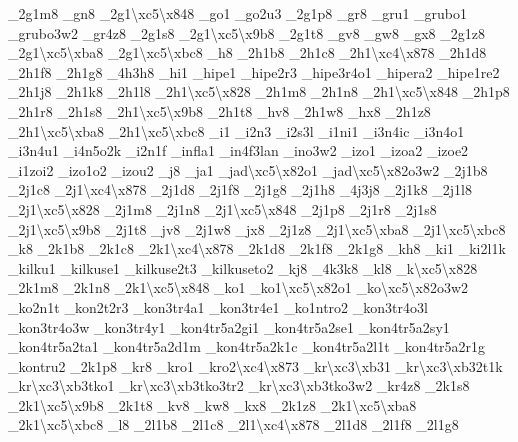 \begin{DoxyCompactItemize}
\-\_\-2g1m8 \-\_\-gn8 \-\_\-2g1\textbackslash{}xc5\textbackslash{}x848 \-\_\-go1 \-\_\-go2u3 \-\_\-2g1p8 \-\_\-gr8 \-\_\-gru1 \-\_\-grubo1 \-\_\-grubo3w2 \-\_\-gr4z8 \-\_\-2g1s8 \-\_\-2g1\textbackslash{}xc5\textbackslash{}x9b8 \-\_\-2g1t8 \-\_\-gv8 \-\_\-gw8 \-\_\-gx8 \-\_\-2g1z8 \-\_\-2g1\textbackslash{}xc5\textbackslash{}xba8 \-\_\-2g1\textbackslash{}xc5\textbackslash{}xbc8 \-\_\-h8 \-\_\-2h1b8 \-\_\-2h1c8 \-\_\-2h1\textbackslash{}xc4\textbackslash{}x878 \-\_\-2h1d8 \-\_\-2h1f8 \-\_\-2h1g8 \-\_\-4h3h8 \-\_\-hi1 \-\_\-hipe1 \-\_\-hipe2r3 \-\_\-hipe3r4o1 \-\_\-hipera2 \-\_\-hipe1re2 \-\_\-2h1j8 \-\_\-2h1k8 \-\_\-2h1l8 \-\_\-2h1\textbackslash{}xc5\textbackslash{}x828 \-\_\-2h1m8 \-\_\-2h1n8 \-\_\-2h1\textbackslash{}xc5\textbackslash{}x848 \-\_\-2h1p8 \-\_\-2h1r8 \-\_\-2h1s8 \-\_\-2h1\textbackslash{}xc5\textbackslash{}x9b8 \-\_\-2h1t8 \-\_\-hv8 \-\_\-2h1w8 \-\_\-hx8 \-\_\-2h1z8 \-\_\-2h1\textbackslash{}xc5\textbackslash{}xba8 \-\_\-2h1\textbackslash{}xc5\textbackslash{}xbc8 \-\_\-i1 \-\_\-i2n3 \-\_\-i2s3l \-\_\-i1ni1 \-\_\-i3n4ic \-\_\-i3n4o1 \-\_\-i3n4u1 \-\_\-i4n5o2k \-\_\-i2n1f \-\_\-infla1 \-\_\-in4f3lan \-\_\-ino3w2 \-\_\-izo1 \-\_\-izoa2 \-\_\-izoe2 \-\_\-i1zoi2 \-\_\-izo1o2 \-\_\-izou2 \-\_\-j8 \-\_\-ja1 \-\_\-jad\textbackslash{}xc5\textbackslash{}x82o1 \-\_\-jad\textbackslash{}xc5\textbackslash{}x82o3w2 \-\_\-2j1b8 \-\_\-2j1c8 \-\_\-2j1\textbackslash{}xc4\textbackslash{}x878 \-\_\-2j1d8 \-\_\-2j1f8 \-\_\-2j1g8 \-\_\-2j1h8 \-\_\-4j3j8 \-\_\-2j1k8 \-\_\-2j1l8 \-\_\-2j1\textbackslash{}xc5\textbackslash{}x828 \-\_\-2j1m8 \-\_\-2j1n8 \-\_\-2j1\textbackslash{}xc5\textbackslash{}x848 \-\_\-2j1p8 \-\_\-2j1r8 \-\_\-2j1s8 \-\_\-2j1\textbackslash{}xc5\textbackslash{}x9b8 \-\_\-2j1t8 \-\_\-jv8 \-\_\-2j1w8 \-\_\-jx8 \-\_\-2j1z8 \-\_\-2j1\textbackslash{}xc5\textbackslash{}xba8 \-\_\-2j1\textbackslash{}xc5\textbackslash{}xbc8 \-\_\-k8 \-\_\-2k1b8 \-\_\-2k1c8 \-\_\-2k1\textbackslash{}xc4\textbackslash{}x878 \-\_\-2k1d8 \-\_\-2k1f8 \-\_\-2k1g8 \-\_\-kh8 \-\_\-ki1 \-\_\-ki2l1k \-\_\-kilku1 \-\_\-kilkuse1 \-\_\-kilkuse2t3 \-\_\-kilkuseto2 \-\_\-kj8 \-\_\-4k3k8 \-\_\-kl8 \-\_\-k\textbackslash{}xc5\textbackslash{}x828 \-\_\-2k1m8 \-\_\-2k1n8 \-\_\-2k1\textbackslash{}xc5\textbackslash{}x848 \-\_\-ko1 \-\_\-ko1\textbackslash{}xc5\textbackslash{}x82o1 \-\_\-ko\textbackslash{}xc5\textbackslash{}x82o3w2 \-\_\-ko2n1t \-\_\-kon2t2r3 \-\_\-kon3tr4a1 \-\_\-kon3tr4e1 \-\_\-ko1ntro2 \-\_\-kon3tr4o3l \-\_\-kon3tr4o3w \-\_\-kon3tr4y1 \-\_\-kon4tr5a2gi1 \-\_\-kon4tr5a2se1 \-\_\-kon4tr5a2sy1 \-\_\-kon4tr5a2ta1 \-\_\-kon4tr5a2d1m \-\_\-kon4tr5a2k1c \-\_\-kon4tr5a2l1t \-\_\-kon4tr5a2r1g \-\_\-kontru2 \-\_\-2k1p8 \-\_\-kr8 \-\_\-kro1 \-\_\-kro2\textbackslash{}xc4\textbackslash{}x873 \-\_\-kr\textbackslash{}xc3\textbackslash{}xb31 \-\_\-kr\textbackslash{}xc3\textbackslash{}xb32t1k \-\_\-kr\textbackslash{}xc3\textbackslash{}xb3tko1 \-\_\-kr\textbackslash{}xc3\textbackslash{}xb3tko3tr2 \-\_\-kr\textbackslash{}xc3\textbackslash{}xb3tko3w2 \-\_\-kr4z8 \-\_\-2k1s8 \-\_\-2k1\textbackslash{}xc5\textbackslash{}x9b8 \-\_\-2k1t8 \-\_\-kv8 \-\_\-kw8 \-\_\-kx8 \-\_\-2k1z8 \-\_\-2k1\textbackslash{}xc5\textbackslash{}xba8 \-\_\-2k1\textbackslash{}xc5\textbackslash{}xbc8 \-\_\-l8 \-\_\-2l1b8 \-\_\-2l1c8 \-\_\-2l1\textbackslash{}xc4\textbackslash{}x878 \-\_\-2l1d8 \-\_\-2l1f8 \-\_\-2l1g8 
\end{DoxyCompactItemize}
